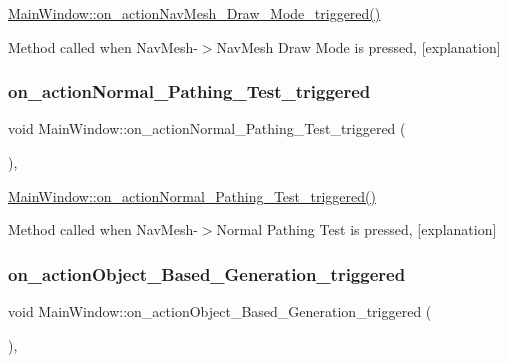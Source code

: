 \hyperlink{class_main_window_ae9c6d0a50e7481bb627e9602b306a265}{Main\+Window\+::on\+\_\+action\+Nav\+Mesh\+\_\+\+Draw\+\_\+\+Mode\+\_\+triggered()} 

Method called when Nav\+Mesh-\/$>$Nav\+Mesh Draw Mode is pressed, \mbox{[}explanation\mbox{]} \mbox{\label{class_main_window_ac03caa5d16c087e2d4fab3cc09c44363}} 
\subsubsection{\texorpdfstring{on\+\_\+action\+Normal\+\_\+\+Pathing\+\_\+\+Test\+\_\+triggered}{on\_actionNormal\_Pathing\_Test\_triggered}}
{\footnotesize\ttfamily void Main\+Window\+::on\+\_\+action\+Normal\+\_\+\+Pathing\+\_\+\+Test\+\_\+triggered (\begin{DoxyParamCaption}{ }\end{DoxyParamCaption})\hspace{0.3cm}{\ttfamily [private]}, {\ttfamily [slot]}}



\hyperlink{class_main_window_ac03caa5d16c087e2d4fab3cc09c44363}{Main\+Window\+::on\+\_\+action\+Normal\+\_\+\+Pathing\+\_\+\+Test\+\_\+triggered()} 

Method called when Nav\+Mesh-\/$>$Normal Pathing Test is pressed, \mbox{[}explanation\mbox{]} \mbox{\label{class_main_window_a8a36e600870d52f9610f71b81f0cda1c}} 
\subsubsection{\texorpdfstring{on\+\_\+action\+Object\+\_\+\+Based\+\_\+\+Generation\+\_\+triggered}{on\_actionObject\_Based\_Generation\_triggered}}
{\footnotesize\ttfamily void Main\+Window\+::on\+\_\+action\+Object\+\_\+\+Based\+\_\+\+Generation\+\_\+triggered (\begin{DoxyParamCaption}{ }\end{DoxyParamCaption})\hspace{0.3cm}{\ttfamily [private]}, {\ttfamily [slot]}}



